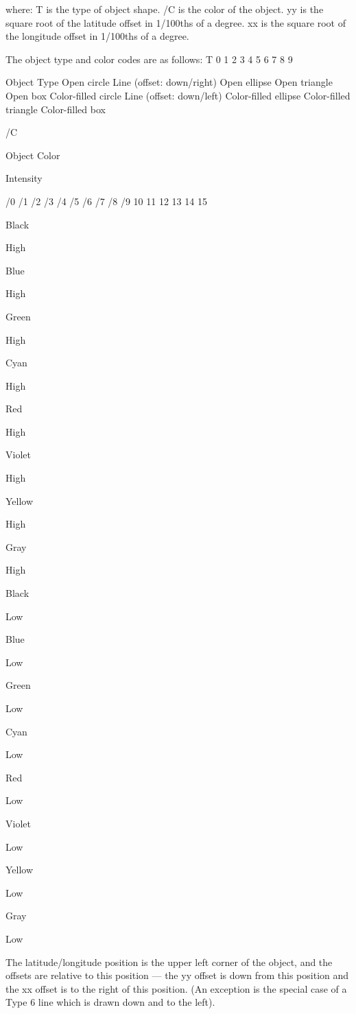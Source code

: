 where:
T is the type of object shape.
/C is the color of the object.
yy is the square root of the latitude offset in 1/100ths of a degree.
xx is the square root of the longitude offset in 1/100ths of a degree.

The object type and color codes are as follows:
T
0
1
2
3
4
5
6
7
8
9

Object Type
Open circle
Line (offset: down/right)
Open ellipse
Open triangle
Open box
Color-filled circle
Line (offset: down/left)
Color-filled ellipse
Color-filled triangle
Color-filled box

/C

Object Color

Intensity

/0
/1
/2
/3
/4
/5
/6
/7
/8
/9
10
11
12
13
14
15

Black

High

Blue

High

Green

High

Cyan

High

Red

High

Violet

High

Yellow

High

Gray

High

Black

Low

Blue

Low

Green

Low

Cyan

Low

Red

Low

Violet

Low

Yellow

Low

Gray

Low

The latitude/longitude position is the upper left corner of the object, and the
offsets are relative to this position — the yy offset is down from this position
and the xx offset is to the right of this position. (An exception is the special
case of a Type 6 line which is drawn down and to the left).



